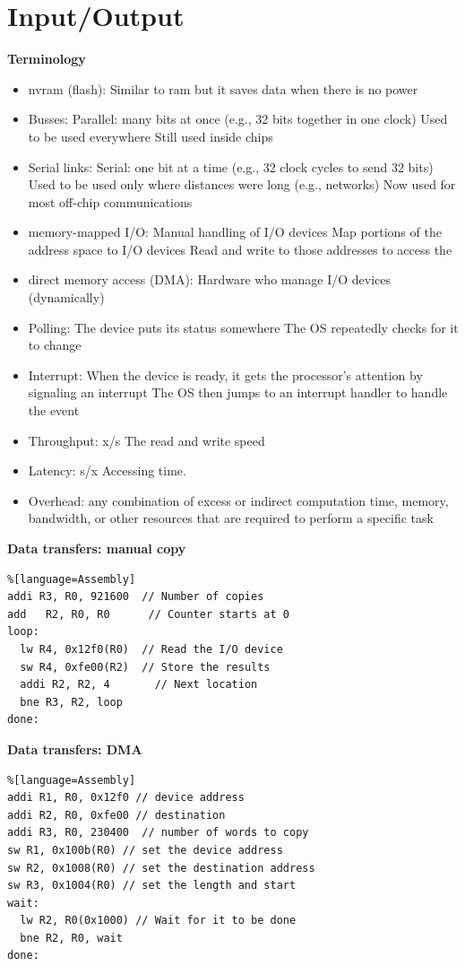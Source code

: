 \newpage


\section{Input/Output}

\textbf{Terminology}
\begin{itemize}
\item  nvram (flash): Similar to ram but it saves data when there is no power
\item  Busses:
  Parallel: many bits at once (e.g., 32 bits together in one clock)
  Used to be used everywhere
  Still used inside chips
\item  Serial links:
  Serial: one bit at a time (e.g., 32 clock cycles to send 32 bits)
  Used to be used only where distances were long (e.g., networks)
  Now used for most off-chip communications
\item  memory-mapped I/O:
  Manual handling of I/O devices
  Map portions of the address space to I/O devices
  Read and write to those addresses to access the 
\item  direct memory access (DMA):
  Hardware who manage I/O devices (dynamically)
\item  Polling:
  The device puts its status somewhere
  The OS repeatedly checks for it to change
\item  Interrupt:
  When the device is ready, it gets the processor’s attention by signaling an interrupt
  The OS then jumps to an interrupt handler to handle the event
\item  Throughput: x/s
  The read and write speed
\item  Latency: s/x
  Accessing time.
\item  Overhead:
  any combination of excess or 
  indirect computation time, memory, bandwidth,
  or other resources that are required to perform a specific task
\end{itemize}


\newpage

\textbf{Data transfers: manual copy}
\begin{lstlisting}%[language=Assembly]
addi R3, R0, 921600  // Number of copies
add   R2, R0, R0      // Counter starts at 0
loop:
  lw R4, 0x12f0(R0)  // Read the I/O device
  sw R4, 0xfe00(R2)  // Store the results
  addi R2, R2, 4       // Next location
  bne R3, R2, loop
done:
\end{lstlisting}


\textbf{Data transfers: DMA}
\begin{lstlisting}%[language=Assembly]
addi R1, R0, 0x12f0 // device address
addi R2, R0, 0xfe00 // destination
addi R3, R0, 230400  // number of words to copy
sw R1, 0x100b(R0) // set the device address
sw R2, 0x1008(R0) // set the destination address
sw R3, 0x1004(R0) // set the length and start
wait:
  lw R2, R0(0x1000) // Wait for it to be done
  bne R2, R0, wait
done:
\end{lstlisting}


